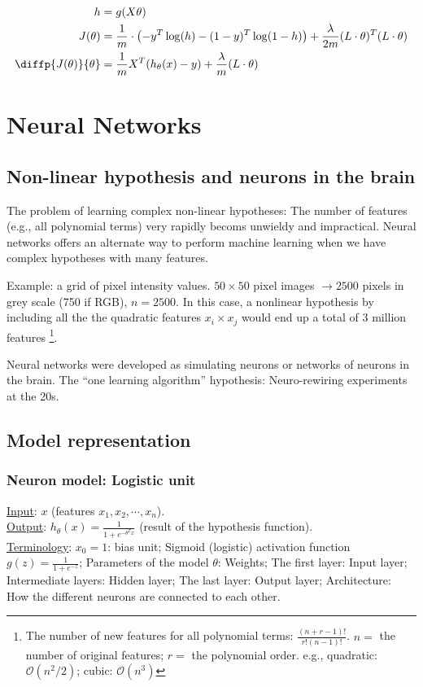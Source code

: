 \begin{align} 
h &= g(X\theta) \nonumber \\
J(\theta) &= \frac{1}{m} \cdot \left(-y^{T}\log(h)-(1-y)^{T}\log(1-h)\right) +\frac{\lambda}{2m}(L\cdot\theta)^T(L\cdot\theta)\\
\diffp{J(\theta)}{\theta} &= \frac{1}{m}X^T(h_\theta(x)-y) + \frac{\lambda}{m}(L\cdot\theta)
\end{align}

\section{Neural Networks}
\label{sec:Neural Networks}
%
\subsection{Non-linear hypothesis and neurons in the brain}
The problem of learning complex non-linear hypotheses: The number of features (e.g., all polynomial terms) very rapidly becoms unwieldy and impractical. Neural networks offers an alternate way to perform machine learning when we have complex hypotheses with many features.

Example: a grid of pixel intensity values. $50 \times 50$ pixel images $\rightarrow 2500$ pixels in grey scale (750 if RGB), $n=2500$. In this case, a nonlinear hypothesis by including all the the quadratic features $x_i \times x_j$ would end up a total of 3 million features \footnote{The number of new features for all polynomial terms: $\frac{(n+r-1)!}{r!(n-1)!}$. $n =$ the number of original features; $r =$  the polynomial order. e.g., quadratic: $\mathcal{O}(n^2/2)$; cubic: $\mathcal{O}(n^3)$}.

Neural networks were developed as simulating neurons or networks of neurons in the brain. The ``one learning algorithm'' hypothesis: Neuro-rewiring experiments at the 20s.
%
\subsection{Model representation}
\subsubsection{Neuron model: Logistic unit}
\underline{Input}: $x$ (features $x_1, x_2, \cdots, x_n$).\\ 
\underline{Output}: $h_\theta(x)=\frac{1}{1+e^{-\theta^{T}x}}$ (result of the hypothesis function).\\
\underline{Terminology}: $x_0=1$: bias unit; Sigmoid (logistic) activation function $g(z) = \frac{1}{1+e^{-z}}$; Parameters of the model $\theta$: Weights; The first layer: Input layer; Intermediate layers: Hidden layer; The last layer: Output layer; Architecture: How the different neurons are connected to each other.\\


